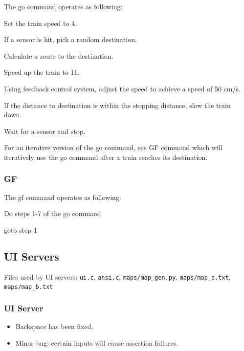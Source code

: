 \documentclass[letterpaper]{article}
\begin{document}
The go command operates as following:
\begin{list}{.}
{
\setlength{\rightmargin}{\leftmargin}
}

\item Set the train speed to 4.

\item If a sensor is hit, pick a random destination.

\item Calculate a route to the destination.

\item Speed up the train to 11.

\item Using feedback control system, adjust the speed to achieve a speed of 50 cm/s.

\item If the distance to destination is within the stopping distance, slow the train down.

\item Wait for a sensor and stop.
\end{list}

For an iterative version of the go command, see GF command which will iteratively use the go command after a train reaches its destination.


\subsubsection{GF%
  \label{gf}%
}

The gf command operates as following:
\setcounter{listcnt0}{0}
\begin{list}{.}
{
\setlength{\rightmargin}{\leftmargin}
}

\item Do steps 1-7 of the go command

\item goto step 1
\end{list}


\subsection{UI Servers%
  \label{ui-servers}%
}

Files used by UI servers: \texttt{ui.c}, \texttt{ansi.c}, \texttt{maps/map\_gen.py}, \texttt{maps/map\_a.txt}, \texttt{maps/map\_b.txt}


\subsubsection{UI Server%
  \label{ui-server}%
}
%
\begin{itemize}

\item Backspace has been fixed.

\item Minor bug: certain inputs will cause assertion failures.

\end{itemize}
\end{document}
